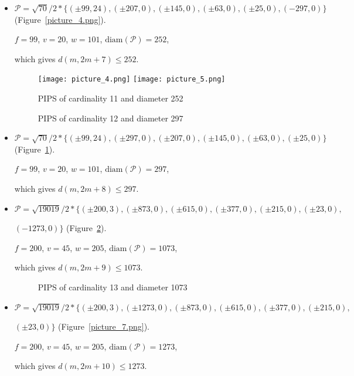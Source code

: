 \documentclass[12pt]{article}
\theoremstyle{theorem}
\theoremstyle{dfn}
\theoremstyle{remark}
\begin{document}
\begin{itemize}
\item
$\mathcal{P}=\sqrt{70}/{2} * \{ (\pm 99, 24),
(\pm 207 , 0),
(\pm 145 , 0),
(\pm 63 , 0),
(\pm 25 , 0),
(-297 , 0)\}
$
(Figure~\ref{picture_4.png}).

$f = 99$, $v = 20$, $w = 101$, $\operatorname{diam(\mathcal{P})} = 252$,

which gives $d(m, 2m + 7) \leq 252$.


\begin{figure}[htbp]
	\texttt{[image: picture\_4.png]}
	\hfill
	\texttt{[image: picture\_5.png]}
	\\
	\parbox{.48\linewidth}{\caption{PIPS of cardinality 11 and diameter 252}
	\label{picture_4.png}}
	\hfill
	\parbox{.48\linewidth}{\caption{PIPS of cardinality 12 and diameter 297}
	\label{picture_5.png}}
\end{figure}


\item
$\mathcal{P}=\sqrt{70}/{2} * \{ (\pm 99, 24),
(\pm 297 , 0),
(\pm 207 , 0),
(\pm 145 , 0),
(\pm 63 , 0),
(\pm 25 , 0)\}
$
(Figure~\ref{picture_5.png}).

$f = 99$, $v = 20$, $w = 101$, $\operatorname{diam(\mathcal{P})} = 297$,

which gives $d(m, 2m + 8) \leq 297$.


\item
$\mathcal{P}=\sqrt{19019}/{2} * \{ (\pm 200, 3),
(\pm 873 , 0),
(\pm 615 , 0),
(\pm 377 , 0),
(\pm 215 , 0),
(\pm 23 , 0),
$

$
(-1273 , 0)\}
$
(Figure~\ref{picture_6.png}).

$f = 200$, $v = 45$, $w = 205$, $\operatorname{diam(\mathcal{P})} = 1073$,

which gives $d(m, 2m + 9) \leq 1073$.


\begin{figure}[h!]
\parbox{0.7\linewidth}{\caption{PIPS of cardinality 13 and diameter 1073}
\label{picture_6.png}}
\end{figure}


\item
$\mathcal{P}=\sqrt{19019}/{2} * \{ (\pm 200, 3),
(\pm 1273 , 0),
(\pm 873 , 0),
(\pm 615 , 0),
(\pm 377 , 0),
(\pm 215 , 0),
$

$
(\pm 23 , 0)\}
$
(Figure~\ref{picture_7.png}).

$f = 200$, $v = 45$, $w = 205$, $\operatorname{diam(\mathcal{P})} = 1273$,

which gives $d(m, 2m + 10) \leq 1273$.



\end{itemize}
\end{document}

